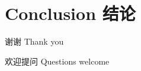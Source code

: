 \documentclass[compress]{beamer}
\begin{document}
\section{Conclusion 结论}

\begin{frame}{谢谢 Thank you}
  \begin{center}
    \Large 欢迎提问 Questions welcome
  \end{center}
\end{frame}
\end{document}
